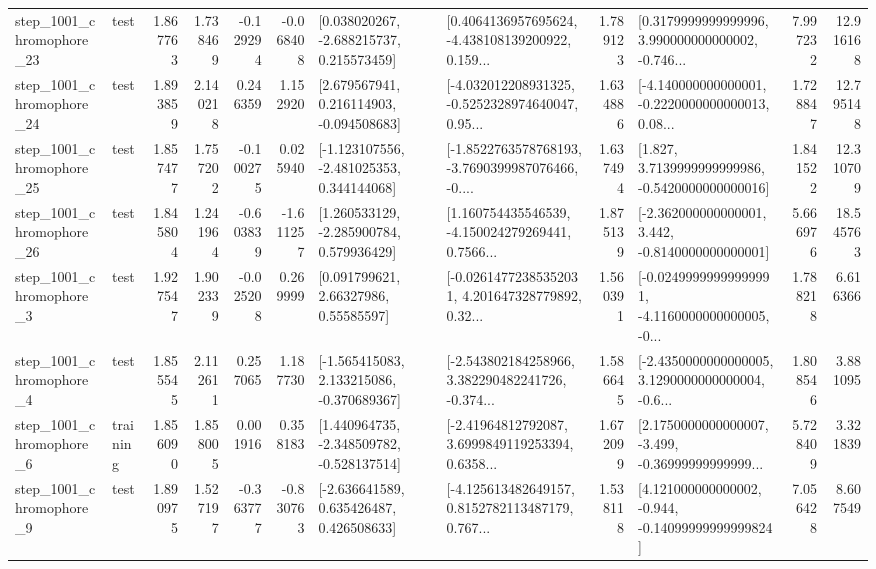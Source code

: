 \begin{tabular}{llrrrrllrlrr}
 step\_1001\_chromophore\_23 &      test &      1.867763 &    1.738469 &     -0.129294 & -0.068408 &    [0.038020267, -2.688215737, 0.215573459] &  [0.4064136957695624, -4.438108139200922, 0.159... &       1.789123 &  [0.3179999999999996, 3.990000000000002, -0.746... &            7.997232 &         12.916168 \\
 step\_1001\_chromophore\_24 &      test &      1.893859 &    2.140218 &      0.246359 &  1.152920 &    [2.679567941, 0.216114903, -0.094508683] &  [-4.032012208931325, -0.5252328974640047, 0.95... &       1.634886 &  [-4.140000000000001, -0.2220000000000013, 0.08... &            1.728847 &         12.795148 \\
 step\_1001\_chromophore\_25 &      test &      1.857477 &    1.757202 &     -0.100275 &  0.025940 &   [-1.123107556, -2.481025353, 0.344144068] &  [-1.8522763578768193, -3.7690399987076466, -0.... &       1.637494 &   [1.827, 3.7139999999999986, -0.5420000000000016] &            1.841522 &         12.310709 \\
 step\_1001\_chromophore\_26 &      test &      1.845804 &    1.241964 &     -0.603839 & -1.611257 &    [1.260533129, -2.285900784, 0.579936429] &  [1.160754435546539, -4.150024279269441, 0.7566... &       1.875139 &   [-2.362000000000001, 3.442, -0.8140000000000001] &            5.666976 &         18.545763 \\
  step\_1001\_chromophore\_3 &      test &      1.927547 &    1.902339 &     -0.025208 &  0.269999 &       [0.091799621, 2.66327986, 0.55585597] &  [-0.02614772385352031, 4.201647328779892, 0.32... &       1.560391 &  [-0.02499999999999991, -4.1160000000000005, -0... &            1.788218 &          6.616366 \\
  step\_1001\_chromophore\_4 &      test &      1.855545 &    2.112611 &      0.257065 &  1.187730 &   [-1.565415083, 2.133215086, -0.370689367] &  [-2.543802184258966, 3.382290482241726, -0.374... &       1.586645 &  [-2.4350000000000005, 3.1290000000000004, -0.6... &            1.808546 &          3.881095 \\
  step\_1001\_chromophore\_6 &  training &      1.856090 &    1.858005 &      0.001916 &  0.358183 &   [1.440964735, -2.348509782, -0.528137514] &  [-2.41964812792087, 3.6999849119253394, 0.6358... &       1.672099 &  [2.1750000000000007, -3.499, -0.36999999999999... &            5.728409 &          3.321839 \\
  step\_1001\_chromophore\_9 &      test &      1.890975 &    1.527197 &     -0.363777 & -0.830763 &    [-2.636641589, 0.635426487, 0.426508633] &  [-4.125613482649157, 0.8152782113487179, 0.767... &       1.538118 &  [4.121000000000002, -0.944, -0.14099999999999824] &            7.056428 &          8.607549 \\

\end{tabular}
